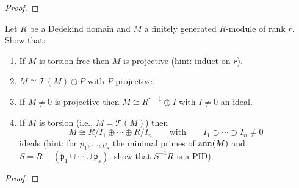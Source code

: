 \begin{proof}
\end{proof}
\newpage
\begin{problem}
Let $R$ be a Dedekind domain and $M$ a finitely generated $R$-module of
rank $r$. Show that:
\begin{enumerate}[label=(\alph*)]
\item If $M$ is torsion free then $M$ is projective (hint: induct on $r$).
\item $M\cong \mathcal{T}(M)\oplus P$ with $P$ projective.
\item If $M\neq 0$ is projective then $M\cong R^{r-1}\oplus I$ with $I\neq
  0$ an ideal.
\item If $M$ is torsion (i.e., $M=\mathcal{T}(M)$) then
\[
M\cong R/I_1\oplus\cdots\oplus R/I_n\qquad\text{with}\qquad
I_1\supset\cdots\supset I_n\neq 0
\]
ideals (hint: for $p_1,...,p_s$ the minimal primes of $\operatorname{ann}(M)$ and
$S=R\minus(\mathfrak{p}_1\cup\cdots\cup\mathfrak{p}_s)$, show that
$S^{-1}R$ is a PID).
\end{enumerate}
\end{problem}
\begin{proof}
\end{proof}


